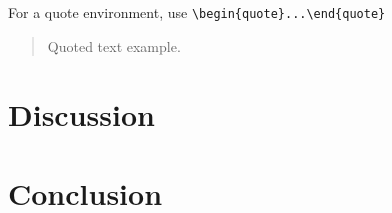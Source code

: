 \begin{definition}
\lipsum[1]
\end{definition}

\noindent
For a quote environment, use \verb+\begin{quote}...\end{quote}+
\begin{quote}
Quoted text example. \lipsum[1]
\end{quote}

\section{Discussion}\label{sec:discussion}

\lipsum[1-3]

\section{Conclusion}\label{sec:conclusion}

\lipsum[1-3]

